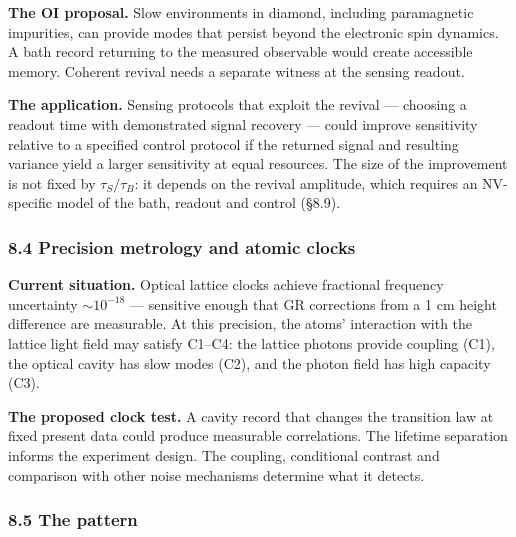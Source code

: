 \documentclass[
]{article}
\begin{document}
\textbf{The OI proposal.} Slow environments in diamond, including
paramagnetic impurities, can provide modes that persist beyond the
electronic spin dynamics. A bath record returning to the measured
observable would create accessible memory. Coherent revival needs a
separate witness at the sensing readout.

\textbf{The application.} Sensing protocols that exploit the revival ---
choosing a readout time with demonstrated signal recovery --- could
improve sensitivity relative to a specified control protocol if the
returned signal and resulting variance yield a larger sensitivity at
equal resources. The size of the improvement is not fixed by
\(\tau_S / \tau_B\): it depends on the revival amplitude, which requires
an NV-specific model of the bath, readout and control (§8.9).

\hypertarget{precision-metrology-and-atomic-clocks}{%
\subsubsection{8.4 Precision metrology and atomic
clocks}\label{precision-metrology-and-atomic-clocks}}

\textbf{Current situation.} Optical lattice clocks achieve fractional
frequency uncertainty \(\sim 10^{-18}\) --- sensitive enough that GR
corrections from a 1 cm height difference are measurable. At this
precision, the atoms' interaction with the lattice light field may
satisfy C1--C4: the lattice photons provide coupling (C1), the optical
cavity has slow modes (C2), and the photon field has high capacity (C3).

\textbf{The proposed clock test.} A cavity record that changes the
transition law at fixed present data could produce measurable
correlations. The lifetime separation informs the experiment design. The
coupling, conditional contrast and comparison with other noise
mechanisms determine what it detects.

\hypertarget{the-pattern}{%
\subsubsection{8.5 The pattern}\label{the-pattern}}
\end{document}
